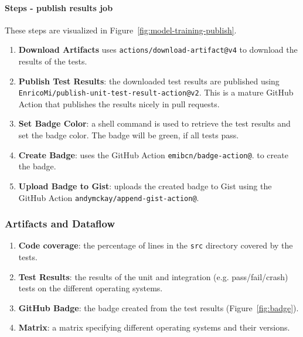 \paragraph{Steps - publish results job} These steps are visualized in Figure~\ref{fig:model-training-publish}.
\begin{enumerate}
    \item \textbf{Download Artifacts} uses \verb|actions/download-artifact@v4| to download the results of the tests. 
    \item \textbf{Publish Test Results}: the downloaded test results are published using \verb|EnricoMi/publish-unit-test-result-action@v2|. This is a mature GitHub Action that publishes the results nicely in pull requests. 
    \item \textbf{Set Badge Color}: a shell command is used to retrieve the test results and set the badge color. The badge will be green, if all tests pass. 
    \item \textbf{Create Badge}: uses the GitHub Action \verb|emibcn/badge-action@|. to create the badge. 
    \item \textbf{Upload Badge to Gist}: uploads the created badge to Gist using the GitHub Action \verb|andymckay/append-gist-action@|.
\end{enumerate}
\subsubsection{Artifacts and Dataflow}
\begin{enumerate}
    \item \textbf{Code coverage}: the percentage of lines in the \verb|src| directory covered by the tests. 
    \item \textbf{Test Results}: the results of the unit and integration (e.g. pass/fail/crash) tests on the different operating systems. 
    \item \textbf{GitHub Badge}: the badge created from the test results (Figure~\ref{fig:badge}). 
    \item \textbf{Matrix}: a matrix specifying different operating systems and their versions. 
\end{enumerate}



